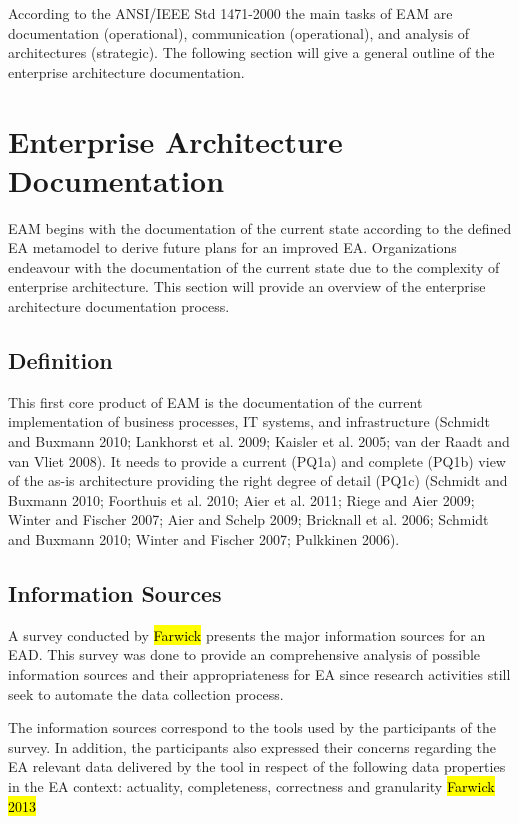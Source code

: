 According to the ANSI/IEEE Std 1471-2000 the main tasks of EAM are documentation (operational), communication (operational), and analysis of architectures (strategic). The following section will give a general outline of the enterprise architecture documentation.


\section{Enterprise Architecture Documentation} 

EAM begins with the documentation of the current state according to the defined EA metamodel to  derive future plans for an improved EA. Organizations endeavour with the documentation of the current state due to the complexity of enterprise architecture. This section will provide an overview of the enterprise architecture documentation process.

\subsection{Definition}

This first core product of EAM is the documentation of the current implementation of business processes, IT systems, and infrastructure (Schmidt and Buxmann 2010; Lankhorst et al. 2009; Kaisler et al. 2005; van der Raadt and van Vliet 2008). It needs to provide a current (PQ1a) and complete (PQ1b) view of the as-is architecture providing the right degree of detail (PQ1c) (Schmidt and Buxmann 2010; Foorthuis et al. 2010; Aier et al. 2011; Riege and Aier 2009; Winter and Fischer 2007; Aier and Schelp 2009; Bricknall et al. 2006; Schmidt and Buxmann 2010; Winter and Fischer 2007; Pulkkinen 2006). 

\subsection{Information Sources}
A survey conducted by \hl{Farwick} presents the major information sources for an EAD. This survey was done to provide an comprehensive analysis of possible information sources and their appropriateness for EA since research activities still seek to automate the data collection process.

The information sources correspond to the tools used by the participants of the survey. In addition, the participants also expressed their concerns regarding the EA relevant data delivered by the tool in respect of the following data properties in the EA context: actuality, completeness, correctness and granularity \hl{Farwick 2013}

